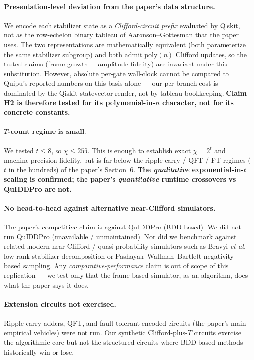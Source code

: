 \documentclass[11pt]{article}
\begin{document}
\paragraph{Presentation-level deviation from the paper's data structure.}
We encode each stabilizer state as a \emph{Clifford-circuit prefix} evaluated by
Qiskit, not as the row-echelon binary tableau of Aaronson--Gottesman that the
paper uses. The two representations are mathematically equivalent (both parameterize
the same stabilizer subgroup) and both admit $\mathrm{poly}(n)$ Clifford updates,
so the tested claims (frame growth + amplitude fidelity) are invariant under this
substitution. However, absolute per-gate wall-clock cannot be compared to
Quipu's reported numbers on this basis alone --- our per-branch cost is dominated
by the Qiskit statevector render, not by tableau bookkeeping. \textbf{Claim H2 is
therefore tested for its polynomial-in-$n$ character, not for its concrete constants.}

\paragraph{$T$-count regime is small.}
We tested $t\le 8$, so $\chi\le 256$. This is enough to establish exact $\chi=2^t$
and machine-precision fidelity, but is far below the ripple-carry / QFT / FT
regimes ($t$ in the hundreds) of the paper's Section~6. \textbf{The
\emph{qualitative} exponential-in-$t$ scaling is confirmed; the paper's
\emph{quantitative} runtime crossovers vs QuIDDPro are not.}

\paragraph{No head-to-head against alternative near-Clifford simulators.}
The paper's competitive claim is against QuIDDPro (BDD-based). We did not run
QuIDDPro (unavailable / unmaintained). Nor did we benchmark against related
modern near-Clifford / quasi-probability simulators such as Bravyi \emph{et al.}
low-rank stabilizer decomposition or Pashayan--Wallman--Bartlett negativity-based
sampling. Any \emph{comparative-performance} claim is out of scope of this
replication --- we test only that the frame-based simulator, as an algorithm,
does what the paper says it does.

\paragraph{Extension circuits not exercised.}
Ripple-carry adders, QFT, and fault-tolerant-encoded circuits (the paper's
main empirical vehicles) were not run. Our synthetic Clifford-plus-$T$ circuits
exercise the algorithmic core but not the structured circuits where BDD-based
methods historically win or lose.
\end{document}
